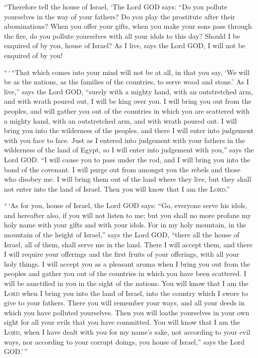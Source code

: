  ``Therefore tell the house of Israel, `The Lord GOD
says: ``Do you pollute yourselves in the way of your fathers? Do you
play the prostitute after their abominations?  When you
offer your gifts, when you make your sons pass through the fire, do you
pollute yourselves with all your idols to this day? Should I be enquired
of by you, house of Israel? As I live, says the Lord GOD, I will not be
enquired of by you!

 ``\,`\,``That which comes into your mind will not be at
all, in that you say, `We will be as the nations, as the families of the
countries, to serve wood and stone.'  As I live,'' says
the Lord GOD, ``surely with a mighty hand, with an outstretched arm, and
with wrath poured out, I will be king over you.  I will
bring you out from the peoples, and will gather you out of the countries
in which you are scattered with a mighty hand, with an outstretched arm,
and with wrath poured out.  I will bring you into the
wilderness of the peoples, and there I will enter into judgement with
you face to face.  Just as I entered into judgement with
your fathers in the wilderness of the land of Egypt, so I will enter
into judgement with you,'' says the Lord GOD.  ``I will
cause you to pass under the rod, and I will bring you into the bond of
the covenant.  I will purge out from amongst you the
rebels and those who disobey me. I will bring them out of the land where
they live, but they shall not enter into the land of Israel. Then you
will know that I am the \textsc{Lord}.''

 ``\,`As for you, house of Israel, the Lord GOD says:
``Go, everyone serve his idols, and hereafter also, if you will not
listen to me; but you shall no more profane my holy name with your gifts
and with your idols.  For in my holy mountain, in the
mountain of the height of Israel,'' says the Lord GOD, ``there all the
house of Israel, all of them, shall serve me in the land. There I will
accept them, and there I will require your offerings and the first
fruits of your offerings, with all your holy things.  I
will accept you as a pleasant aroma when I bring you out from the
peoples and gather you out of the countries in which you have been
scattered. I will be sanctified in you in the sight of the nations.
 You will know that I am the \textsc{Lord} when I bring
you into the land of Israel, into the country which I swore to give to
your fathers.  There you will remember your ways, and all
your deeds in which you have polluted yourselves. Then you will loathe
yourselves in your own sight for all your evils that you have committed.
 You will know that I am the \textsc{Lord}, when I have
dealt with you for my name's sake, not according to your evil ways, nor
according to your corrupt doings, you house of Israel,'' says the Lord
GOD.'\,''

